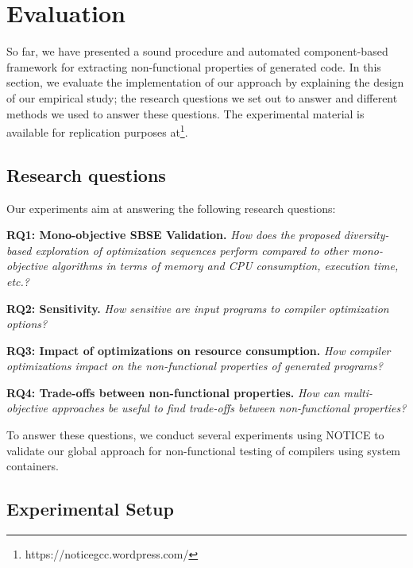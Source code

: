 \section{Evaluation}
So far, we have presented a sound procedure and automated component-based framework for extracting non-functional properties of generated code. In this section, we evaluate the implementation of our approach by explaining the design of our empirical study; the research questions we set out to answer and different methods we used to answer these questions. The experimental material is available for replication purposes at\footnote{https://noticegcc.wordpress.com/}.

\subsection{Research questions}
Our experiments aim at answering the following research questions:

\textbf{RQ1: Mono-objective SBSE Validation.} 
\textit{How does the proposed diversity-based exploration of optimization sequences perform compared to other mono-objective algorithms in terms of memory and CPU consumption, execution time, etc.?} 
 

\textbf{RQ2: Sensitivity.} 
\textit{How sensitive are input programs to compiler optimization options?}


\textbf{RQ3: Impact of optimizations on resource consumption.} 
\textit{How compiler optimizations impact on the non-functional properties of generated programs?}


\textbf{RQ4: Trade-offs between non-functional properties.} 
\textit{How can multi-objective approaches be useful to find trade-offs between non-functional properties?}

To answer these questions, we conduct several experiments using NOTICE to validate our global approach for non-functional testing of compilers using system containers.
 

\subsection{Experimental Setup}
